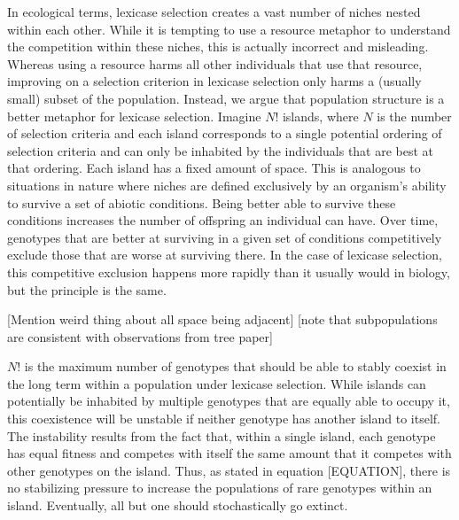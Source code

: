 In ecological terms, lexicase selection creates a vast number of niches nested within each other. While it is tempting to use a resource metaphor to understand the competition within these niches, this is actually incorrect and misleading. Whereas using a resource harms all other individuals that use that resource, improving on a selection criterion in lexicase selection only harms a (usually small) subset of the population. Instead, we argue that population structure is a better metaphor for lexicase selection. Imagine $N!$ islands, where $N$ is the number of selection criteria and each island corresponds to a single potential ordering of selection criteria and can only be inhabited by the individuals that are best at that ordering. Each island has a fixed amount of space. This is analogous to situations in nature where niches are defined exclusively by an organism's ability to survive a set of abiotic conditions. Being better able to survive these conditions increases the number of offspring an individual can have. Over time, genotypes that are better at surviving in a given set of conditions competitively exclude those that are worse at surviving there. In the case of lexicase selection, this competitive exclusion happens more rapidly than it usually would in biology, but the principle is the same. 

[Mention weird thing about all space being adjacent]
[note that subpopulations are consistent with observations from tree paper]

$N!$ is the maximum number of genotypes that should be able to stably coexist in the long term within a population under lexicase selection. While islands can potentially be inhabited by multiple genotypes that are equally able to occupy it, this coexistence will be unstable if neither genotype has another island to itself. The instability results from the fact that, within a single island, each genotype has equal fitness and competes with itself the same amount that it competes with other genotypes on the island. Thus, as stated in equation [EQUATION], there is no stabilizing pressure to increase the populations of rare genotypes within an island. Eventually, all but one should stochastically go extinct.

